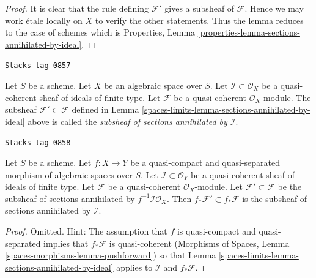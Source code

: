 \begin{proof}
It is clear that the rule defining $\mathcal{F}'$ gives a subsheaf
of $\mathcal{F}$. Hence we may work \'etale locally on $X$ to verify
the other statements. Thus the lemma reduces to the case of schemes
which is
Properties, Lemma \ref{properties-lemma-sections-annihilated-by-ideal}.
\end{proof}

\begin{definition}
\label{spaces-limits-definition-subsheaf-sections-annihilated-by-ideal}
\href{https://stacks.math.columbia.edu/tag/0857}{\texttt{Stacks tag 0857}}

Let $S$ be a scheme. Let $X$ be an algebraic space over $S$.
Let $\mathcal{I} \subset \mathcal{O}_X$ be a quasi-coherent
sheaf of ideals of finite type.
Let $\mathcal{F}$ be a quasi-coherent $\mathcal{O}_X$-module.
The subsheaf $\mathcal{F}' \subset \mathcal{F}$ defined in
Lemma \ref{spaces-limits-lemma-sections-annihilated-by-ideal} above is called
the {\it subsheaf of sections annihilated by $\mathcal{I}$}.
\end{definition}

\begin{lemma}
\label{spaces-limits-lemma-push-sections-annihilated-by-ideal}
\href{https://stacks.math.columbia.edu/tag/0858}{\texttt{Stacks tag 0858}}

Let $S$ be a scheme.
Let $f : X \to Y$ be a quasi-compact and quasi-separated morphism
of algebraic spaces over $S$.
Let $\mathcal{I} \subset \mathcal{O}_Y$ be a quasi-coherent
sheaf of ideals of finite type. Let $\mathcal{F}$ be a quasi-coherent
$\mathcal{O}_X$-module. Let $\mathcal{F}' \subset \mathcal{F}$
be the subsheaf of sections annihilated by $f^{-1}\mathcal{I}\mathcal{O}_X$.
Then $f_*\mathcal{F}' \subset f_*\mathcal{F}$ is the subsheaf
of sections annihilated by $\mathcal{I}$.
\end{lemma}

\begin{proof}
Omitted. Hint: The assumption that $f$ is quasi-compact and
quasi-separated implies that $f_*\mathcal{F}$ is quasi-coherent
(Morphisms of Spaces, Lemma \ref{spaces-morphisms-lemma-pushforward})
so that Lemma \ref{spaces-limits-lemma-sections-annihilated-by-ideal} applies
to $\mathcal{I}$ and $f_*\mathcal{F}$.
\end{proof}


